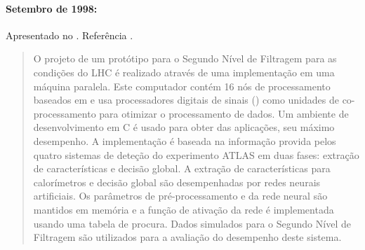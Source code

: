 \paragraph{Setembro de 1998: } Apresentado no . Referência
\cite{aa:vecpar-1998}.

\begin{quotation}
O projeto de um protótipo para o Segundo Nível de Filtragem para as condições
do LHC é realizado através de uma implementação em uma máquina paralela. Este
computador contém 16 nós de processamento baseados em  e usa
processadores digitais de sinais () como unidades de
co-processamento para otimizar o processamento de dados. Um ambiente de
desenvolvimento em C é usado para obter das aplicações, seu máximo
desempenho. A implementação é baseada na informação provida pelos quatro
sistemas de deteção do experimento ATLAS em duas fases: extração de
características e decisão global. A extração de características para
calorímetros e decisão global são desempenhadas por redes neurais
artificiais. Os parâmetros de pré-processamento e da rede neural são mantidos
em memória e a função de ativação da rede é implementada usando uma tabela de
procura. Dados simulados para o Segundo Nível de Filtragem são utilizados para
a avaliação do desempenho deste sistema.
\end{quotation}

